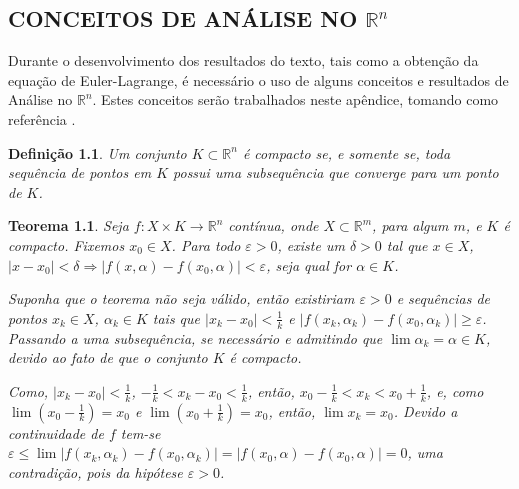 \documentclass[
	12pt,				%
	openright,			%
    twoside,			%
	a4paper,			%
	english,			%
	french,				%
	spanish,			%
	brazil				%
	]{abntex2}
\makeatletter
\newtheorem{teorema}{Teorema}
\newtheorem{definicao}{Definição}
\renewenvironment{proof}[1][\proofname]{
	\par\pushQED{\qed}%
	\normalfont \topsep6\p@\@plus6\p@\relax
	\trivlist
	\item\relax
		{\itshape
			#1\@addpunct{.}}\hspace\labelsep\ignorespaces
}{%
	\popQED\endtrivlist\@endpefalse
}
\numberwithin{lema}{chapter}
\numberwithin{teorema}{chapter}
\numberwithin{definicao}{chapter}
\numberwithin{exemplo}{chapter}
\numberwithin{figure}{chapter}
\makeatother
\begin{document}
\begin{apendicesenv}

\partapendices

\chapter{CONCEITOS DE ANÁLISE NO $\mathbb{R}^n$}
\label{apend:regra_de_leibniz}
{
	Durante o desenvolvimento dos resultados do texto, tais como a obtenção da equação de Euler-Lagrange, é necessário o uso de alguns conceitos e resultados de Análise no $\mathbb{R}^n$. Estes conceitos serão trabalhados neste apêndice, tomando como referência .

	\begin{definicao}
		Um conjunto $K\subset \mathbb{R}^n$ é compacto se, e somente se, toda sequência de pontos em $K$ possui uma subsequência que converge para um ponto de $K$.
	\end{definicao}

	\begin{teorema}
		\label{teorema:func_uniformemente}
		Seja $f:X\times K \longrightarrow \mathbb{R}^n$ contínua, onde $X\subset \mathbb{R}^m$, para algum $m$, e $K$ é compacto. Fixemos $x_0 \in X$. Para todo $\varepsilon > 0$, existe um $\delta > 0$ tal que $x\in X$, $|x-x_0|<\delta \Longrightarrow |f(x, \alpha)-f(x_0,\alpha)|<\varepsilon$, seja qual for $\alpha \in K$.
		\begin{proof}
		Suponha que o teorema não seja válido, então existiriam $\varepsilon > 0$ e sequências de pontos $x_k\in X$, $\alpha_k \in K$ tais que $|x_k-x_0|<\frac{1}{k}$ e $|f(x_k,\alpha_k)-f(x_0,\alpha_k)|\geqslant \varepsilon$. Passando a uma subsequência, se necessário e admitindo que $\lim \alpha_k=\alpha \in K$, devido ao fato de que o conjunto $K$ é compacto.
		
		Como, $|x_k-x_0|<\frac{1}{k}$, $-\frac{1}{k}<x_k-x_0<\frac{1}{k}$, então, $x_0-\frac{1}{k}<x_k<x_0+\frac{1}{k}$, e, como $\lim \left (x_0-\frac{1}{k} \right ) = x_0$ e $\lim \left ( x_0 + \frac{1}{k} \right )=x_0$, então, $\lim x_k=x_0$. Devido a continuidade de $f$ tem-se $\varepsilon \leqslant \lim |f(x_k,\alpha_k)-f(x_0,\alpha _k)|=|f(x_0,\alpha)-f(x_0,\alpha)|=0$, uma contradição, pois da hipótese $\varepsilon >0$.
		\end{proof}
	\end{teorema}
	
}
\end{apendicesenv}
\end{document}
